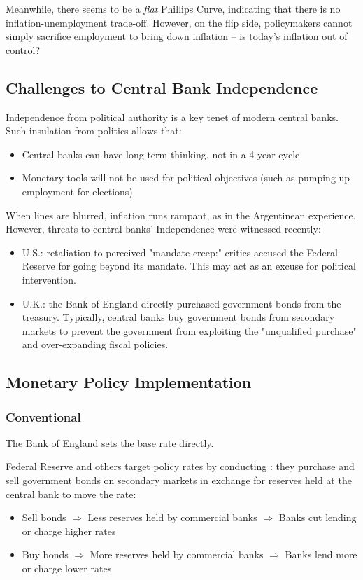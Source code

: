             Meanwhile, there seems to be a \emph{flat} Phillips Curve, indicating that there is no inflation-unemployment trade-off. However, on the flip side, policymakers cannot simply sacrifice employment to bring down inflation -- is today's inflation out of control?

    \subsection{Challenges to Central Bank Independence}

        Independence from political authority is a key tenet of modern central banks. Such insulation from politics allows that:
        \begin{itemize}
            \item Central banks can have long-term thinking, not in a 4-year cycle
            \item Monetary tools will not be used for political objectives (such as pumping up employment for elections)
        \end{itemize}

        When lines are blurred, inflation runs rampant, as in the Argentinean experience. However, threats to central banks' Independence were witnessed recently:
        \begin{itemize}
            \item U.S.: retaliation to perceived "mandate creep:" critics accused the Federal Reserve for going beyond its mandate. This may act as an excuse for political intervention.
            \item U.K.: the Bank of England directly purchased government bonds from the treasury. Typically, central banks buy government bonds from secondary markets to prevent the government from exploiting the "unqualified purchase" and over-expanding fiscal policies.
        \end{itemize}
        
    \subsection{Monetary Policy Implementation}

        \subsubsection{Conventional}
            The Bank of England sets the base rate directly.

            Federal Reserve and others target policy rates by conducting : they purchase and sell government bonds on secondary markets in exchange for reserves held at the central bank to move the rate:
            \begin{itemize}
                \item Sell bonds $\Rightarrow$ Less reserves held by commercial banks $\Rightarrow$ Banks cut lending or charge higher rates
                \item Buy bonds $\Rightarrow$ More reserves held by commercial banks $\Rightarrow$ Banks lend more or charge lower rates
            \end{itemize}
            
